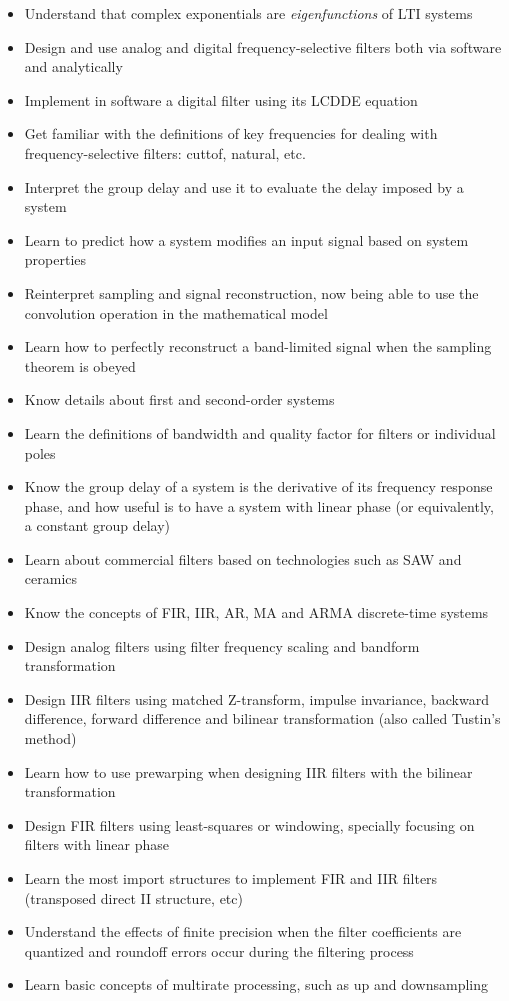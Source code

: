 \begin{itemize}
	\item Understand that complex exponentials are \emph{eigenfunctions} of LTI systems
	\item Design and use analog and digital frequency-selective filters both via software and analytically
	\item Implement in software a digital filter using its LCDDE equation
	\item Get familiar with the definitions of key frequencies for dealing with frequency-selective filters: cuttof, natural, etc.
	\item Interpret the group delay and use it to evaluate the delay imposed by a system
	\item Learn to predict how a system modifies an input signal based on system properties
	\item Reinterpret sampling and signal reconstruction, now being able to use the convolution operation in the mathematical model
	\item Learn how to perfectly reconstruct a band-limited signal when the sampling theorem is obeyed
	\item Know details about first and second-order systems
	\item Learn the definitions of bandwidth and quality factor for filters or individual poles
	\item Know the group delay of a system is the derivative of its frequency response phase, and how useful is to have a system with linear phase (or equivalently, a constant group delay)
	\item Learn about commercial filters based on technologies such as SAW and ceramics
	\item Know the concepts of FIR, IIR, AR, MA and ARMA discrete-time systems
	\item Design analog filters using filter frequency scaling and bandform transformation
	\item Design IIR filters using matched Z-transform, impulse invariance, backward difference, forward difference and bilinear transformation (also called Tustin's method) 
	\item Learn how to use prewarping when designing IIR filters with the bilinear transformation
	\item Design FIR filters using least-squares or windowing, specially focusing on filters with linear phase
	\item Learn the most import structures to implement FIR and IIR filters (transposed direct II structure, etc)
	\item Understand the effects of finite precision when the filter coefficients are quantized and roundoff errors occur during
	the filtering process
	\item Learn basic concepts of multirate processing, such as up and downsampling
\end{itemize}

